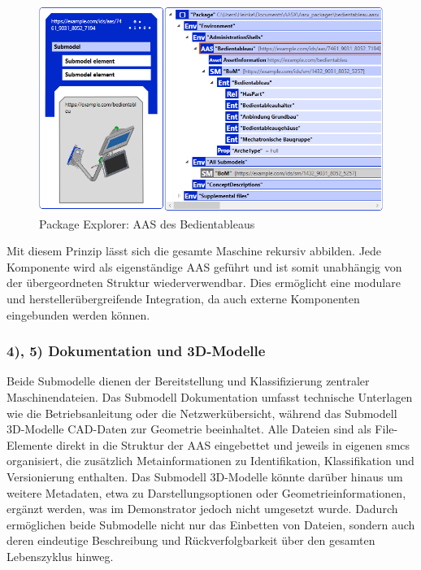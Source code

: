\begin{figure}[htbp]
    \centering
        \includegraphics[width=1\textwidth]{Bilder/ErgebnissePackageExplorer/Bedientableau+.PNG}
    \caption{Package Explorer: AAS des Bedientableaus}
    \label{fig:AASBedientableau}
\end{figure}

Mit diesem Prinzip lässt sich die gesamte Maschine rekursiv abbilden. 
Jede Komponente wird als eigenständige AAS geführt und ist somit unabhängig von der übergeordneten Struktur wiederverwendbar. 
Dies ermöglicht eine modulare und herstellerübergreifende Integration, da auch externe Komponenten eingebunden werden können.

\subsubsection*{4), 5) Dokumentation und 3D-Modelle}
\vspace{-0.5em}

Beide Submodelle dienen der Bereitstellung und Klassifizierung zentraler Maschinendateien. 
Das Submodell Dokumentation umfasst technische Unterlagen wie die Betriebsanleitung oder die Netzwerkübersicht, während das Submodell 3D-Modelle CAD-Daten zur Geometrie beeinhaltet. 
Alle Dateien sind als File-Elemente direkt in die Struktur der AAS eingebettet und jeweils in eigenen \acsp{smc} organisiert, die zusätzlich Metainformationen zu Identifikation, Klassifikation und Versionierung enthalten. 
Das Submodell 3D-Modelle könnte darüber hinaus um weitere Metadaten, etwa zu Darstellungsoptionen oder Geometrieinformationen, ergänzt werden, was im Demonstrator jedoch nicht umgesetzt wurde. 
Dadurch ermöglichen beide Submodelle nicht nur das Einbetten von Dateien, sondern auch deren eindeutige Beschreibung und Rückverfolgbarkeit über den gesamten Lebenszyklus hinweg.

